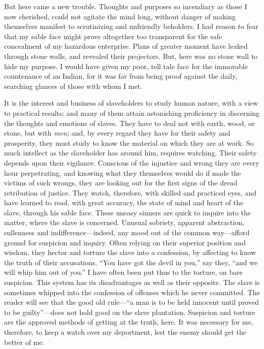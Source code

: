 But here came a new trouble. Thoughts and purposes so incendiary as
those I now cherished, could not agitate the mind long, without danger
of making themselves manifest to scrutinizing and unfriendly beholders.
I had reason to fear that my sable face might prove altogether too
transparent for the safe concealment of my hazardous enterprise. Plans
of greater moment have leaked through stone walls, and revealed their
projectors. But, here was no stone wall to hide my purpose. I would have
given my poor, tell tale face for the immovable countenance of an
Indian, for it was far from being proof against the daily, searching
glances of those with whom I met.

It is the interest and business of slaveholders to study human nature,
with a view to practical results; and many of them attain astonishing
proficiency in discerning the thoughts and emotions of slaves. They have
to deal not with earth, wood, or stone, but with {}\emph{men;} and, by
every regard they have for their safety and prosperity, they must study
to know the material on which they are at work. So much intellect as the
slaveholder has around him, requires watching. Their safety depends upon
their vigilance. Conscious of the injustice and wrong they are every
hour perpetrating, and knowing what they themselves would do if made the
victims of such wrongs, they are looking out for the first signs of the
dread retribution of justice. They watch, therefore, with skilled and
practiced eyes, and have learned to read, with great accuracy, the state
of mind and heart of the slave, through his sable face. These uneasy
sinners are quick to inquire into the matter, where the slave is
concerned. Unusual sobriety, apparent abstraction, sullenness and
indifference---indeed, any mood out of the common way---afford ground
for suspicion and inquiry. Often relying on their superior position and
wisdom, they hector and torture the slave into a confession, by
affecting to know the truth of their accusations. ``You have got the
devil in you,'' say they, ``and we will whip him out of you.'' I have
often been put thus to the torture, on bare suspicion. This system has
its disadvantages as well as their opposite. The slave is sometimes
whipped into the confession of offenses which he never committed. The
reader will see that the good old rule---``a man is to be held innocent
until proved to be guilty''---does not hold good on the slave
plantation. Suspicion and torture are the approved methods of getting at
the truth, here. It was necessary for me, therefore, to {}keep a watch
over my deportment, lest the enemy should get the better of me.

